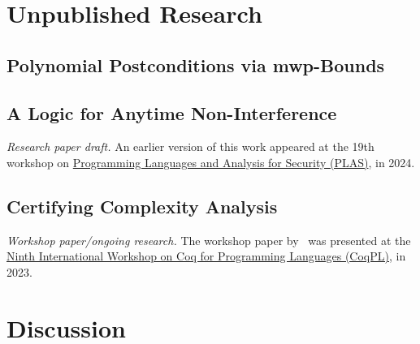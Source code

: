 \chapter{Unpublished Research}\label{ch:unpublished-research}

    \section{Polynomial Postconditions via mwp-Bounds}\label{sec:postcond}
    \pageIconFm
    \clearpage
    
    \clearpage

    \section{A Logic for Anytime Non-Interference}\label{sec:anytime}
    \pageIconSecurity
    {\emph{Research paper draft.}
    \newline\newline{}An earlier version of this work appeared at the 19th
    workshop on \href{https://plas24.github.io/}
    {Programming Languages and Analysis for Security (PLAS)}, in 2024.}
    \clearpage
    {}
    \clearpage

    \section{Certifying Complexity Analysis}\label{sec:mwp-calc-formal}
    \pageIconFm
    {\emph{Workshop paper/ongoing research.}
    \newline\newline{}The workshop paper by~ was presented at
    the \href{https://popl23.sigplan.org/home/CoqPL-2023} {Ninth International
    Workshop on Coq for Programming Languages (CoqPL)}, in 2023.}
    \clearpage
    
    \clearpage

\chapter{Discussion}\label{ch:discussion}


